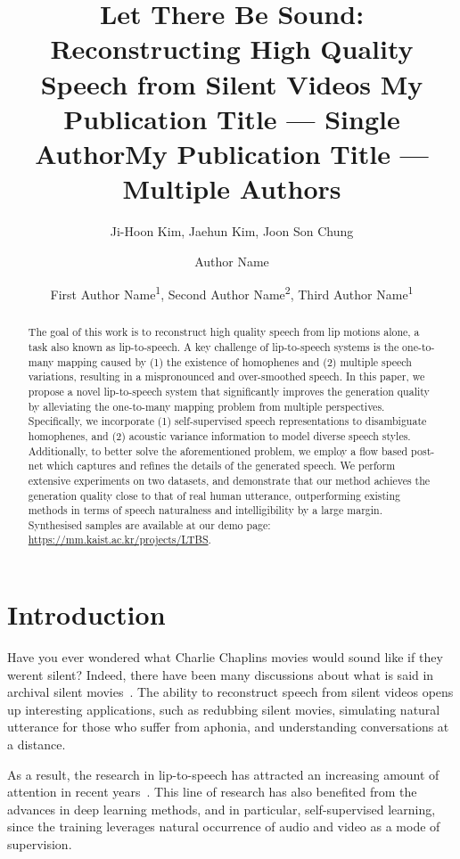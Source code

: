 \documentclass[letterpaper]{article} %
\title{
Let There Be Sound: Reconstructing High Quality Speech from Silent Videos
}
\author{
Ji-Hoon Kim\equalcontrib,
Jaehun Kim\equalcontrib,
Joon Son Chung
}
\title{My Publication Title --- Single Author}
\author {
Author Name
}
\title{My Publication Title --- Multiple Authors}
\author {
First Author Name\textsuperscript{\rm 1},
Second Author Name\textsuperscript{\rm 2},
Third Author Name\textsuperscript{\rm 1}
}
\begin{document}
\maketitle

\begin{abstract}
The goal of this work is to reconstruct high quality speech from lip motions alone, a task also known as lip-to-speech. A key challenge of lip-to-speech systems is the one-to-many mapping caused by (1) the existence of homophenes and (2) multiple speech variations, resulting in a mispronounced and over-smoothed speech. In this paper, we propose a novel lip-to-speech system that significantly improves the generation quality by alleviating the one-to-many mapping problem from multiple perspectives. Specifically, we incorporate (1) self-supervised speech representations to disambiguate homophenes, and (2) acoustic variance information to model diverse speech styles. Additionally, to better solve the aforementioned problem, we employ a flow based post-net which captures and refines the details of the generated speech. We perform extensive experiments on two datasets, and demonstrate that our method achieves the generation quality close to that of real human utterance, outperforming existing methods in terms of speech naturalness and intelligibility by a large margin. Synthesised samples are available at our demo page: \url{https://mm.kaist.ac.kr/projects/LTBS}.
\end{abstract}


\section{Introduction}
Have you ever wondered what Charlie Chaplins movies would sound like if they werent silent? Indeed, there have been many discussions about what is said in archival silent movies~\cite{smith1987when,midgley2006new}. The ability to reconstruct speech from silent videos opens up interesting applications, such as redubbing silent movies, simulating natural utterance for those who suffer from aphonia, and understanding conversations at a distance.

As a result, the research in lip-to-speech has attracted an increasing amount of attention in recent years~\cite{kumar2019lipper,mira2022svts,kim2023lip}. This line of research has also benefited from the advances in deep learning methods, and in particular, self-supervised learning, since the training leverages natural occurrence of audio and video as a mode of supervision.
\end{document}
